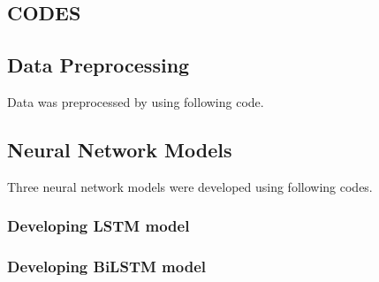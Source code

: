 
\begin{appendices}
\raggedbottom

\chapter{CODES}
\label{matlab}
\section{Data Preprocessing}
Data was preprocessed by using following code.


\vspace{2.5ex}
\section{Neural Network Models}
Three neural network models were developed using following codes.
\subsection{Developing LSTM model}

\subsection{Developing BiLSTM model}


\vspace{2.5ex}


\end{appendices}